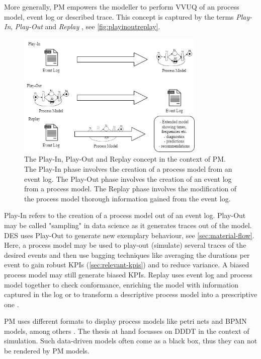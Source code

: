 More generally, PM empowers the modeller to perform VVUQ of an process model, event log or described trace. This concept is captured by the terms \textit{Play-In}, \textit{Play-Out} and \textit{Replay} \autocite{damm2001lscs}, see \autoref{fig:playinoutreplay}.

\begin{figure}[htbp]
  \centering
  \includegraphics[width=0.8\textwidth]{figures/playinplayoutreplay.png}
  \caption{The Play-In, Play-Out and Replay concept in the context of PM. The Play-In phase involves the creation of a process model from an event log. The Play-Out phase involves the creation of an event log from a process model. The Replay phase involves the modification of the process model thorough information gained from the event log.}
  \label{fig:playinoutreplay}
\end{figure}

Play-In refers to the creation of a process model out of an event log. Play-Out may be called "sampling" in data science as it generates traces out of the model. DES uses Play-Out to generate new exemplary behaviour, see \autoref{sec:material-flow}. Here, a process model may be used to play-out (simulate) several traces of the desired events and then use bagging techniques like averaging the durations per event to gain robust KPIs (\autoref{sec:relevant-kpis}) and to reduce variance. A biased process model may still generate biased KPIs. Replay uses event log and process model together to check conformance, enriching the model with information captured in the log or to transform a descriptive process model into a prescriptive one \autocite{van2016data}.

PM uses different formats to display process models like petri nets and BPMN models, among others \autocite{vanderAalst2012}. The thesis at hand focusses on DDDT in the context of simulation. Such data-driven models often come as a black box, thus they can not be rendered by PM models.

